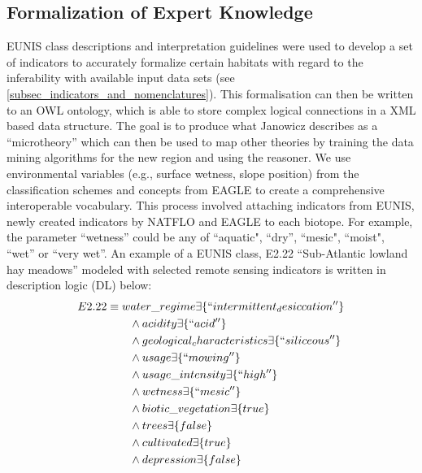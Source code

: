 \documentclass[authoryear, review,12pt,number]{elsarticle}
\begin{document}
\subsection{Formalization of Expert Knowledge}
EUNIS class descriptions and interpretation guidelines \citep{EUNISManual} were
used to develop a set of indicators to accurately formalize certain habitats
with regard to the inferability with available input data sets (see
\ref{subsec_indicators_and_nomenclatures}). This formalisation can then be
written to an OWL ontology, which is able to store complex logical connections
in a XML based data structure. The goal is to produce what Janowicz describes
as a ``microtheory'' \citep{Janowicz2012} which can then be used to map other
theories by training the data mining algorithms for the new
region and using the reasoner. We use environmental variables (e.g., surface
wetness, slope position) from the classification schemes and concepts from
EAGLE to create a comprehensive interoperable vocabulary. This process involved
attaching indicators from EUNIS, newly created indicators by NATFLO and EAGLE
to each biotope. For example, the parameter ``wetness'' could be any of
``aquatic", ``dry'', ``mesic", ``moist", ``wet'' or ``very wet''. An example of
a EUNIS class, E2.22 ``Sub-Atlantic lowland hay meadows'' modeled with selected remote sensing
indicators is written in description logic (DL) below:
\begin{align*}
E2.22 &\equiv water\_regime \exists \{``intermittent_desiccation''\} \\
&\qquad {} \land acidity \exists \{``acid''\} \\
&\qquad {} \land geological_characteristics \exists \{``siliceous''\}\\
&\qquad {} \land usage \exists \{``mowing''\} \\
&\qquad {} \land usage\_intensity \exists \{``high''\} \\
&\qquad {} \land wetness \exists \{``mesic''\} \\
&\qquad {} \land biotic\_vegetation \exists \{true\}\\ 
&\qquad {} \land trees \exists \{false\} \\
&\qquad {} \land cultivated \exists \{true\}\\
&\qquad {} \land depression \exists \{false\}\\
\end{align*}
\end{document}
